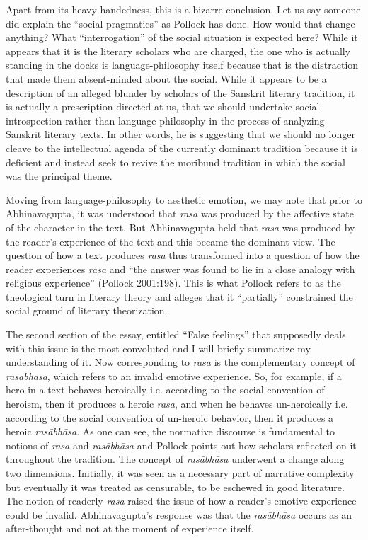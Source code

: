 Apart from its heavy-handedness, this is a bizarre conclusion. Let us say someone did explain the ``social pragmatics'' as Pollock has done. How would that change anything? What ``interrogation'' of the social situation is expected here? While it appears that it is the literary scholars who are charged, the one who is actually standing in the docks is language-philosophy itself because that is the distraction that made them absent-minded about the social. While it appears to be a description of an alleged blunder by scholars of the Sanskrit literary tradition, it is actually a prescription directed at us, that we should undertake social introspection rather than language-philosophy in the process of analyzing Sanskrit literary texts. In other words, he is suggesting that we should no longer cleave to the intellectual agenda of the currently dominant tradition because it is deficient and instead seek to revive the moribund tradition in which the social was the principal theme.

Moving from language-philosophy to aesthetic emotion, we may note that prior to Abhinavagupta, it was understood that \textsl{rasa} was produced by the affective state of the character in the text. But Abhinavagupta held that \textsl{rasa} was produced by the reader's experience of the text and this became the dominant view. The question of how a text produces \textsl{rasa} thus transformed into a question of how the reader experiences \textsl{rasa} and ``the answer was found to lie in a close analogy with religious experience'' (Pollock 2001:198). This is what Pollock refers to as the theological turn in literary theory and alleges that it ``partially'' constrained the social ground of literary theorization.

The second section of the essay, entitled ``False feelings'' that supposedly deals with this issue is the most convoluted and I will briefly summarize my understanding of it. Now corresponding to \textsl{rasa} is the complementary concept of \textsl{rasābhāsa}, which refers to an invalid emotive experience. So, for example, if a hero in a text behaves heroically i.e. according to the social convention of heroism, then it produces a heroic \textsl{rasa}, and when he behaves un-heroically i.e. according to the social convention of un-heroic behavior, then it produces a heroic \textsl{rasābhāsa}. As one can see, the normative discourse is fundamental to notions of \textsl{rasa} and \textsl{rasābhāsa} and Pollock points out how scholars reflected on it throughout the tradition. The concept of \textsl{rasābhāsa} underwent a change along two dimensions. Initially, it was seen as a necessary part of narrative complexity but eventually it was treated as censurable, to be eschewed in good literature. The notion of readerly \textsl{rasa} raised the issue of how a reader's emotive experience could be invalid. Abhinavagupta's response was that the \textsl{rasābhāsa} occurs as an after-thought and not at the moment of experience itself.

